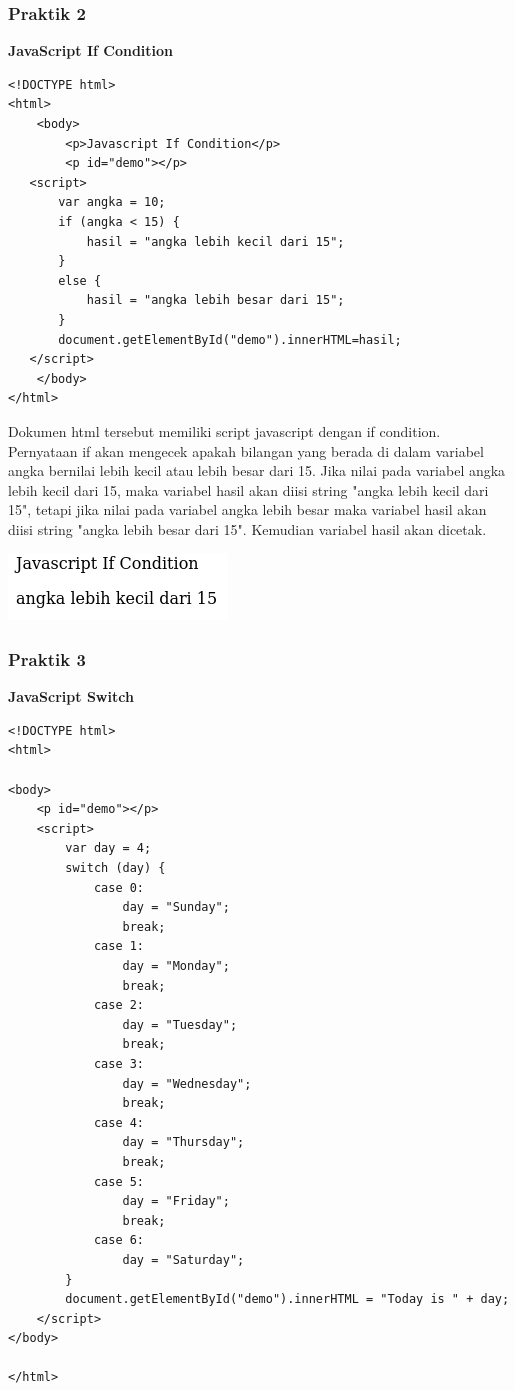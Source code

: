 \documentclass[a4paper,12pt]{article}
\begin{document}
\subsubsection{Praktik 2}
\textbf{JavaScript If Condition}
\begin{lstlisting}
<!DOCTYPE html>
<html>
    <body>
        <p>Javascript If Condition</p>
        <p id="demo"></p>
   <script>
       var angka = 10;
       if (angka < 15) {
           hasil = "angka lebih kecil dari 15";
       }
       else {
           hasil = "angka lebih besar dari 15";
       }
       document.getElementById("demo").innerHTML=hasil;
   </script>
    </body>
</html>
\end{lstlisting}
Dokumen html tersebut memiliki script javascript dengan if condition. Pernyataan if akan mengecek apakah bilangan yang
berada di dalam variabel angka bernilai lebih kecil atau lebih besar dari 15. Jika nilai pada variabel angka lebih kecil
dari 15, maka variabel hasil akan diisi string "angka lebih kecil dari 15", tetapi jika nilai pada variabel angka lebih
besar maka variabel hasil akan diisi string "angka lebih besar dari 15". Kemudian variabel hasil akan dicetak.

\begin{center}
    \includegraphics[scale=.7]{2.png} 
\end{center}

\subsubsection{Praktik 3}
\textbf{JavaScript Switch}
\begin{lstlisting}
<!DOCTYPE html>
<html>

<body>
    <p id="demo"></p>
    <script>
        var day = 4;
        switch (day) {
            case 0:
                day = "Sunday";
                break;
            case 1:
                day = "Monday";
                break;
            case 2:
                day = "Tuesday";
                break;
            case 3:
                day = "Wednesday";
                break;
            case 4:
                day = "Thursday";
                break;
            case 5:
                day = "Friday";
                break;
            case 6:
                day = "Saturday";
        }
        document.getElementById("demo").innerHTML = "Today is " + day;
    </script>
</body>

</html>

\end{lstlisting}
\end{document}
